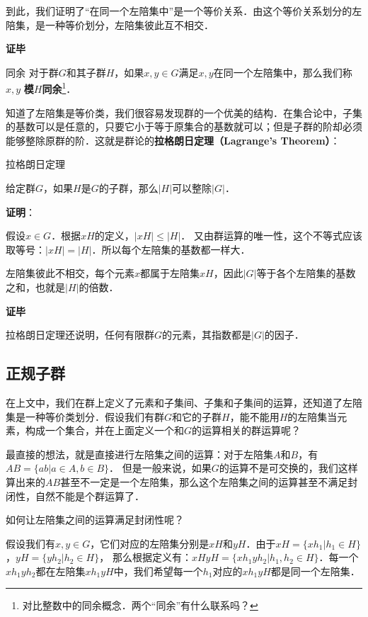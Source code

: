 到此，我们证明了“在同一个左陪集中”是一个等价关系．由这个等价关系划分的左陪集，是一种等价划分，左陪集彼此互不相交．

\textbf{证毕}

\begin{definition}{同余}
对于群$G$和其子群$H$，如果$x, y\in G$满足$x, y$在同一个左陪集中，那么我们称$x, y$ \textbf{模$H$同余}\footnote{对比整数中的同余概念．两个“同余”有什么联系吗？}．
\end{definition}

知道了左陪集是等价类，我们很容易发现群的一个优美的结构．在集合论中，子集的基数可以是任意的，只要它小于等于原集合的基数就可以；但是子群的阶却必须能够整除原群的阶．这就是群论的\textbf{拉格朗日定理（Lagrange's Theorem）}：

\begin{theorem}{拉格朗日定理}\label{Group1_the2}

给定群$G$，如果$H$是$G$的子群，那么$|H|$可以整除$|G|$．

\end{theorem}

\textbf{证明}：

假设$x\in G$．根据$xH$的定义，$|xH|\leq|H|$． 又由群运算的唯一性，这个不等式应该取等号：$|xH|=|H|$．所以每个左陪集的基数都一样大．

左陪集彼此不相交，每个元素$x$都属于左陪集$xH$，因此$|G|$等于各个左陪集的基数之和，也就是$|H|$的倍数．

\textbf{证毕}

拉格朗日定理还说明，任何有限群$G$的元素，其指数都是$|G|$的因子．

\subsection{正规子群}

在上文中，我们在群上定义了元素和子集间、子集和子集间的运算，还知道了左陪集是一种等价类划分．假设我们有群$G$和它的子群$H$，能不能用$H$的左陪集当元素，构成一个集合，并在上面定义一个和$G$的运算相关的群运算呢？

最直接的想法，就是直接进行左陪集之间的运算：对于左陪集$A$和$B$，有$AB=\{ab|a\in A, b\in B\}$． 但是一般来说，如果$G$的运算不是可交换的，我们这样算出来的$AB$甚至不一定是一个左陪集，那么这个左陪集之间的运算甚至不满足封闭性，自然不能是个群运算了．

如何让左陪集之间的运算满足封闭性呢？

假设我们有$x, y\in G$，它们对应的左陪集分别是$xH$和$yH$．由于$xH=\{xh_1|h_1\in H\}$，$yH=\{yh_2|h_2\in H\}$， 那么根据定义有：$xHyH=\{xh_1yh_2|h_1, h_2\in H\}$．每一个$xh_1yh_2$都在左陪集$xh_1yH$中，我们希望每一个$h_1$对应的$xh_1yH$都是同一个左陪集．

